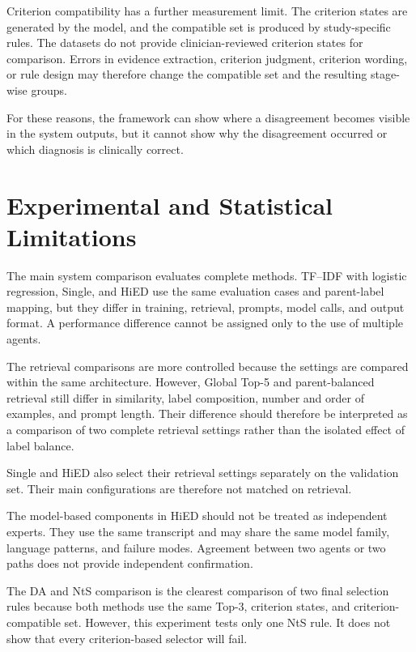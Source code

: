 \documentclass[12pt,a4paper,oneside]{report}
\begin{document}
Criterion compatibility has a further measurement limit. The criterion
states are generated by the model, and the compatible set is produced by
study-specific rules. The datasets do not provide clinician-reviewed
criterion states for comparison. Errors in evidence extraction,
criterion judgment, criterion wording, or rule design may therefore
change the compatible set and the resulting stage-wise groups.

For these reasons, the framework can show where a disagreement becomes
visible in the system outputs, but it cannot show why the disagreement
occurred or which diagnosis is clinically correct.

\section{Experimental and Statistical Limitations}
\label{sec:model-comparison-limitations}
\label{sec:statistical-reproducibility-limitations}

The main system comparison evaluates complete methods. TF--IDF with
logistic regression, Single, and HiED use the same evaluation cases and
parent-label mapping, but they differ in training, retrieval, prompts,
model calls, and output format. A performance difference cannot be
assigned only to the use of multiple agents.

The retrieval comparisons are more controlled because the settings are
compared within the same architecture. However, Global Top-5 and
parent-balanced retrieval still differ in similarity, label
composition, number and order of examples, and prompt length. Their
difference should therefore be interpreted as a comparison of two
complete retrieval settings rather than the isolated effect of label
balance.

Single and HiED also select their retrieval settings separately on the
validation set. Their main configurations are therefore not matched on
retrieval.

The model-based components in HiED should not be treated as independent
experts. They use the same transcript and may share the same model
family, language patterns, and failure modes. Agreement between two
agents or two paths does not provide independent confirmation.

The DA and NtS comparison is the clearest comparison of two final
selection rules because both methods use the same Top-3, criterion
states, and criterion-compatible set. However, this experiment tests
only one NtS rule. It does not show that every criterion-based selector
will fail.
\end{document}
